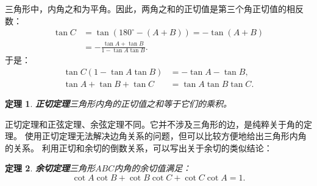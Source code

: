 \documentclass[12pt,UTF8]{ctexbook}
\newtheorem{tm}{定理}[section]
\begin{document}
三角形中，内角之和为平角。因此，两角之和的正切值是第三个角正切值的相反数：
\begin{align*}
    \tan C &= \tan (180^\circ - (A + B)) = - \tan (A + B)  \\
    &= - \frac{\tan A + \tan B}{1 - \tan A \tan B}.  
\end{align*}
于是：
\begin{align*}
    \tan C (1 - \tan A \tan B) &= - \tan A - \tan B,  \\
    \tan A + \tan B + \tan C &= \tan A \tan B \tan C. 
\end{align*}
\begin{tm}{\textbf{正切定理}}\label{tm:2-5-10}
    三角形内角的正切值之和等于它们的乘积。
\end{tm}
正切定理和正弦定理、余弦定理不同。它并不涉及三角形的边，是纯粹关于角的定理。
使用正切定理无法解决边角关系的问题，但可以比较方便地给出三角形内角的关系。
利用正切和余切的倒数关系，可以写出关于余切的类似结论：
\begin{tm}{\textbf{余切定理}}\label{tm:2-5-20}
    三角形$ABC$内角的余切值满足：
    $$ \cot A \cot B + \cot B \cot C + \cot C \cot A = 1.$$
\end{tm}
\end{document}
